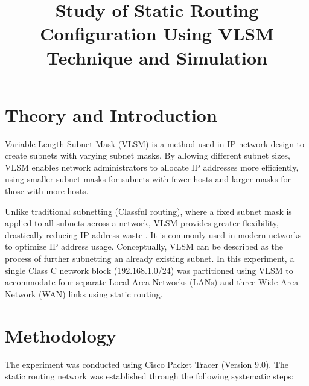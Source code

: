 \documentclass[11pt]{article}
\title{Study of Static Routing Configuration Using VLSM Technique and Simulation}
\author{}
\date{}
\begin{document}


\pagebreak

\tableofcontents

\pagebreak
{}
\maketitle

\section{Theory and Introduction}
Variable Length Subnet Mask (VLSM) is a method used in IP network design to create subnets with varying subnet masks. By allowing different subnet sizes, VLSM enables network administrators to allocate IP addresses more efficiently, using smaller subnet masks for subnets with fewer hosts and larger masks for those with more hosts.

Unlike traditional subnetting (Classful routing), where a fixed subnet mask is applied to all subnets across a network, VLSM provides greater flexibility, drastically reducing IP address waste \cite{tanenbaum2021}. It is commonly used in modern networks to optimize IP address usage. Conceptually, VLSM can be described as the process of further subnetting an already existing subnet. In this experiment, a single Class C network block (192.168.1.0/24) was partitioned using VLSM to accommodate four separate Local Area Networks (LANs) and three Wide Area Network (WAN) links using static routing.

\section{Methodology}
The experiment was conducted using Cisco Packet Tracer (Version 9.0). The static routing network was established through the following systematic steps:
\end{document}
